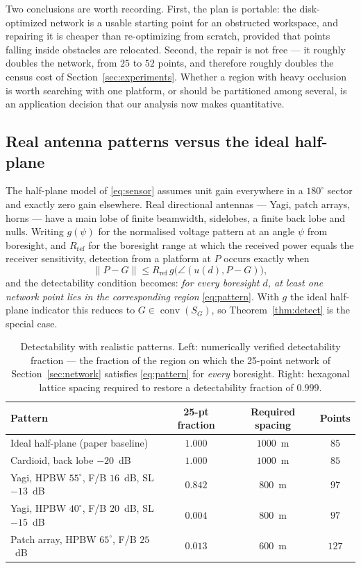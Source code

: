 \documentclass[journal,10pt]{IEEEtran}
\theoremstyle{definition}
\newcommand{\conv}{\operatorname{conv}}
\begin{document}
Two conclusions are worth recording. First, the plan is portable: the disk-optimized network is a
usable starting point for an obstructed workspace, and repairing it is cheaper than re-optimizing
from scratch, provided that points falling inside obstacles are relocated. Second, the repair is
not free --- it roughly doubles the network, from $25$ to $52$ points, and therefore roughly
doubles the census cost of Section~\ref{sec:experiments}. Whether a region with heavy occlusion is
worth searching with one platform, or should be partitioned among several, is an application
decision that our analysis now makes quantitative.


\subsection{Real antenna patterns versus the ideal half-plane}
\label{sec:antenna}

The half-plane model of \eqref{eq:sensor} assumes unit gain everywhere in a $180^\circ$ sector and
exactly zero gain elsewhere. Real directional antennas --- Yagi, patch arrays, horns --- have a
main lobe of finite beamwidth, sidelobes, a finite back lobe and nulls. Writing $g(\psi)$ for the
normalised voltage pattern at an angle $\psi$ from boresight, and $R_{\mathrm{ref}}$ for the
boresight range at which the received power equals the receiver sensitivity, detection from a
platform at $P$ occurs exactly when
\begin{equation}
\|P-G\|\le R_{\mathrm{ref}}\,g\bigl(\angle(u(d),P-G)\bigr),
\label{eq:pattern}
\end{equation}
and the detectability condition becomes: \emph{for every boresight $d$, at least one network point
lies in the corresponding region} \eqref{eq:pattern}. With $g$ the ideal half-plane indicator this
reduces to $G\in\conv(S_G)$, so Theorem~\ref{thm:detect} is the special case.

\begin{table}[t]
\caption{Detectability with realistic patterns. Left: numerically verified detectability fraction
--- the fraction of the region on which the 25-point network of Section~\ref{sec:network}
satisfies \eqref{eq:pattern} for \emph{every} boresight. Right: hexagonal lattice spacing
required to restore a detectability fraction of $0.999$.}
\label{tab:antenna}
\centering
\small
\begin{tabular}{lccc}
\toprule
Pattern & 25-pt fraction & Required spacing & Points \\
\midrule
Ideal half-plane (paper baseline)        & $1.000$ & $1000$~m & $85$ \\
Cardioid, back lobe $-20$~dB             & $1.000$ & $1000$~m & $85$ \\
Yagi, HPBW $55^\circ$, F/B $16$~dB, SL $-13$~dB & $0.842$ & $800$~m & $97$ \\
Yagi, HPBW $40^\circ$, F/B $20$~dB, SL $-15$~dB & $0.004$ & $800$~m & $97$ \\
Patch array, HPBW $65^\circ$, F/B $25$~dB       & $0.013$ & $600$~m & $127$ \\
\bottomrule
\end{tabular}
\end{table}
\end{document}
